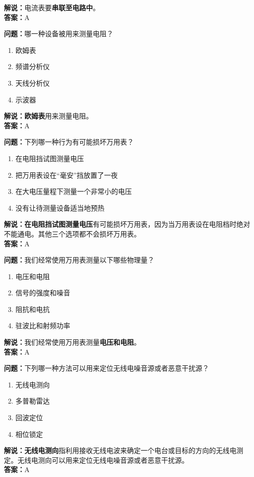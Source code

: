 \textbf{解说：}电流表要\textbf{串联至电路中}。\\\textbf{答案：}A%


\textbf{问题：}哪一种设备被用来测量电阻？

\begin{enumerate}[label=\Alph*), leftmargin=1.5cm]
	\item 欧姆表
	\item 频谱分析仪
	\item 天线分析仪
	\item 示波器
\end{enumerate}

\textbf{解说：欧姆表}用来测量电阻。\\\textbf{答案：}A


\textbf{问题：}下列哪一种行为有可能损坏万用表？

\begin{enumerate}[label=\Alph*), leftmargin=1.5cm]
	\item 在电阻挡试图测量电压
	\item 把万用表设在“毫安”挡放置了一夜
	\item 在大电压量程下测量一个非常小的电压
	\item 没有让待测量设备适当地预热
\end{enumerate}

\textbf{解说：在电阻挡试图测量电压}有可能损坏万用表，因为当万用表设在电阻档时绝对不能通电。其他三个选项都不会损坏万用表。\\\textbf{答案：}A%

\textbf{问题：}我们经常使用万用表测量以下哪些物理量？

\begin{enumerate}[label=\Alph*), leftmargin=1.5cm]
	\item 电压和电阻
	\item 信号的强度和噪音
	\item 阻抗和电抗
	\item 驻波比和射频功率
\end{enumerate}

\textbf{解说：}我们经常使用万用表测量\textbf{电压和电阻}。\\\textbf{答案：}A%


\textbf{问题：}下列哪一种方法可以用来定位无线电噪音源或者恶意干扰源？

\begin{enumerate}[label=\Alph*), leftmargin=1.5cm]
	\item 无线电测向
	\item 多普勒雷达
	\item 回波定位
	\item 相位锁定
\end{enumerate}

\textbf{解说：无线电测向}指利用接收无线电波来确定一个电台或目标的方向的无线电测定。无线电测向可以用来定位无线电噪音源或者恶意干扰源。\\\textbf{答案：}A%


